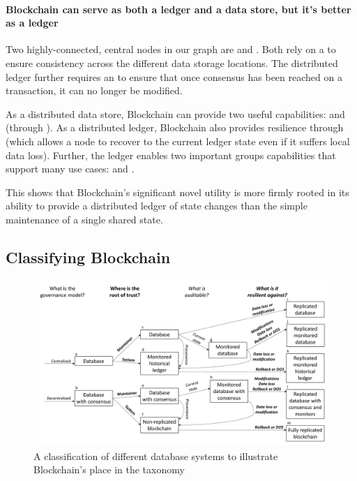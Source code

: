 {\paragraph{Blockchain can serve as both a ledger and a data store, but it's better as a ledger}
Two highly-connected, central nodes in our graph are  and . Both rely on a  to ensure consistency across the different data storage locations. The distributed ledger further requires an  to ensure that once consensus has been reached on a transaction, it can no longer be modified. 

As a distributed data store, Blockchain can provide two useful capabilities:  and  (through ). As a distributed ledger, Blockchain also provides resilience through  (which allows a node to recover to the current ledger state even if it suffers local data loss). Further, the ledger enables two important groups capabilities that support many use cases:  and . 

This shows that Blockchain's significant novel utility is more firmly rooted in its ability to provide a distributed ledger of state changes than the simple maintenance of a single shared state.

\subsection{Classifying Blockchain }

\begin{figure}
	\centering
	\includegraphics[width=\textwidth]{figures/BlockchainFlowchart.png}
	\caption{A classification of different database systems to illustrate Blockchain's place in the taxonomy}
	\label{fig:blockchainFlowchart}
\end{figure}

}
